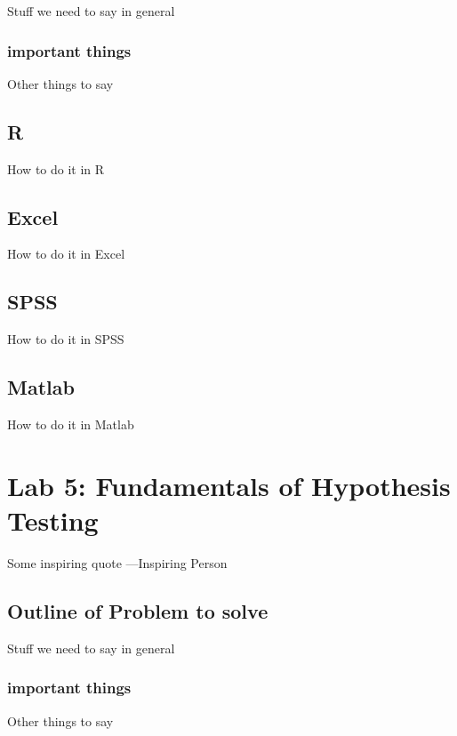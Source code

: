 \documentclass[]{book}
\theoremstyle{definition}
\theoremstyle{definition}
\theoremstyle{definition}
\theoremstyle{remark}
\begin{document}
Stuff we need to say in general

\subsection{important things}\label{important-things-2}

Other things to say

\section{R}\label{r-4}

How to do it in R

\section{Excel}\label{excel-3}

How to do it in Excel

\section{SPSS}\label{spss-3}

How to do it in SPSS

\section{Matlab}\label{matlab-3}

How to do it in Matlab

\chapter{Lab 5: Fundamentals of Hypothesis
Testing}\label{lab-5-fundamentals-of-hypothesis-testing}

{ Some inspiring quote ---Inspiring Person }

\section{Outline of Problem to
solve}\label{outline-of-problem-to-solve-3}

Stuff we need to say in general

\subsection{important things}\label{important-things-3}

Other things to say
\end{document}
